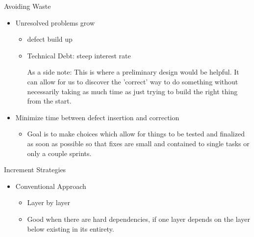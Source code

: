 \documentclass{report}
\begin{document}
\begin{description}
    \item Avoiding Waste
        \begin{itemize}
            \item Unresolved problems grow
                \begin{itemize}
                    \item defect build up
                    \item Technical Debt: steep interest rate
                        \begin{mdframed}
                             As a side note: This is where
                             a preliminary design would be
                             helpful. It can allow for us to
                             discover the 'correct' way to
                             do something without necessarily
                             taking as much time as just trying
                             to build the right thing from the
                             start.
                        \end{mdframed}
                \end{itemize}
            \item Minimize time between defect insertion and
                correction
                \begin{itemize}
                    \item Goal is to make choices which allow
                        for things to be tested and finalized
                        as soon as possible so that fixes are
                        small and contained to single tasks
                        or only a couple sprints.
                \end{itemize}
        \end{itemize}
    \item Increment Strategies
        \begin{itemize}
            \item Conventional Approach
                \begin{itemize}
                    \item Layer by layer
                    \item Good when there are hard dependencies,
                        if one layer depends on the layer below existing
                        in its entirety.


\end{itemize}
\end{itemize}
\end{description}
\end{document}
